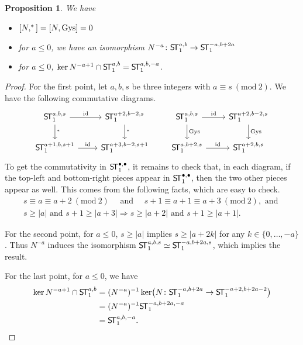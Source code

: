 \documentclass[11pt]{amsart}
\newtheorem{prop}[thm]{Proposition}
\theoremstyle{definition}
\numberwithin{equation}{section}
\renewcommand{\~}{\widetilde}
\newcommand{\myand}{\text{ and }}
\newcommand{\bul}{\bullet} %
\newcommand{\zint}[2]{\{#1,\dots,#2\}}
\renewcommand{\pmod}[1]{\ (\mathrm{mod}\ #1)}
\DeclareMathOperator{\gys}{Gys} %
\DeclareMathOperator{\id}{id} %
\let\i\relax
\newcommand{\i}{{\mathop{}\mathrm{i}}} %
\newcommand{\abs}[1]{\lvert #1\rvert} %
\newcommand{\ST}{\textnormal{\textsf{S\!T}}} %
\begin{document}
\begin{prop} \label{prop:N_commutes} We have
\begin{itemize}
\item $[N,\i^*] = [N, \gys] =0$
\item for $a\leq 0$, we have an isomorphism $N^{-a} \colon \ST_1^{a,b} \to \ST_1^{-a, b+2a} $
\item for $a \leq 0$, $\ker N^{-a+1} \cap \ST_1^{a,b} = \ST_1^{a, b, -a}$.
\end{itemize}
\end{prop}

\begin{proof}
For the first point, let $a, b, s$ be three integers with $a \equiv s \pmod 2$. We have the following commutative diagrams.
\[ \begin{tikzcd}
\ST^{a,b,s}_1 \rar["\id"]\dar["\i^*"] & \ST^{a+2,b-2,s}_1 \dar["\i^*"] \\
\ST^{a+1,b,s+1}_1 \rar["\id"] & \ST^{a+3,b-2,s+1}_1
\end{tikzcd} \qquad \begin{tikzcd}
\ST^{a,b,s}_1 \rar["\id"]\dar["\gys"] & \ST^{a+2,b-2,s}_1 \dar["\gys"] \\
\ST^{a,b+2,s}_1 \rar["\id"] & \ST^{a+2,b,s}_1
\end{tikzcd} \]
To get the commutativity in $\ST_1^{\bul,\bul}$, it remains to check that, in each diagram, if the top-left and bottom-right pieces appear in $\ST_1^{\bul,\bul}$, then the two other pieces appear as well. This comes from the following facts, which are easy to check.
\begin{gather*}
s \equiv a \equiv a+2 \pmod 2 \quad\myand\quad s+1 \equiv a+1 \equiv a+3 \pmod 2, \myand \\
s\geq\abs{a} \myand s+1\geq\abs{a+3} \Longrightarrow s\geq\abs{a+2} \myand s+1\geq\abs{a+1}.
\end{gather*}

\medskip

For the second point, for $a\leq0$, $s\geq\abs{a}$ implies $s\geq\abs{a+2k}$ for any $k\in\zint0{-a}$. Thus $N^{-a}$ induces the isomorphism $\ST_1^{a,b,s}\simeq\ST_1^{-a,b+2a,s}$, which implies the result.

\medskip

For the last point, for $a\leq0$, we have
\begin{align*}
\ker N^{-a+1}\cap\ST_1^{a,b}
  &= (N^{-a})^{-1}\ker\bigl(N\colon\ST_1^{-a,b+2a}\to\ST_1^{-a+2,b+2a-2}\bigr) \\
  &= (N^{-a})^{-1}\ST_1^{-a,b+2a,-a} \\
  &= \ST_1^{a,b,-a}. \qedhere
\end{align*}
\end{proof}
\end{document}
